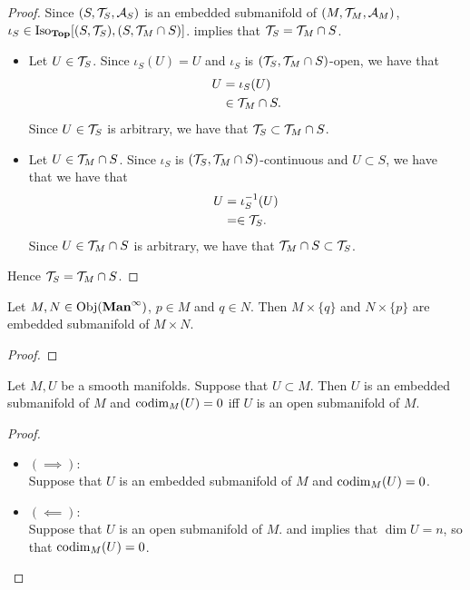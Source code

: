 \documentclass{book}
\begin{document}
	\begin{proof}
		Since $(S, \mathcal{T}_S, \mathcal{A}_S)$ is an embedded submanifold of $(M, \mathcal{T}_M, \mathcal{A}_M)$, $\iota_S \in \operatorname{Iso}_{\operatorname*{\text{\textbf{Top}}}}[(S, \mathcal{T}_S), (S, \mathcal{T}_M \cap S)]$.  implies that $\mathcal{T}_S = \mathcal{T}_M \cap S$.
		\begin{itemize}
			\item Let $U \in \mathcal{T}_S$. Since $\iota_S(U) = U$ and $\iota_S$ is $(\mathcal{T}_S, \mathcal{T}_M \cap S)$-open, we have that 
			\begin{align*}
				U 
				& = \iota_S(U) \\
				& \in \mathcal{T}_M \cap S.
			\end{align*}
			Since $U \in \mathcal{T}_S$ is arbitrary, we have that $\mathcal{T}_S \subset \mathcal{T}_M \cap S$.  
			\item Let $U \in \mathcal{T}_M \cap S$. Since $\iota_S$ is $(\mathcal{T}_S, \mathcal{T}_M \cap S)$-continuous and $U \subset S$, we have that we have that 
			\begin{align*}
				U
				& = \iota_S^{-1}(U) \\
				& = \in \mathcal{T}_S.
			\end{align*}
			Since $U \in \mathcal{T}_M \cap S$ is arbitrary, we have that  $\mathcal{T}_M \cap S \subset \mathcal{T}_S$. 
		\end{itemize}
		Hence $\mathcal{T}_S = \mathcal{T}_M \cap S$. 
	\end{proof}

	\begin{ex} 
		Let $M, N \in \operatorname{Obj}(\operatorname*{\text{\textbf{Man}}^{\infty}})$, $p \in M$ and $q \in N$. Then $M \times \{q\}$ and $N \times \{p\}$ are embedded submanifold of $M \times N$. 
	\end{ex}

	\begin{proof}
	\end{proof}

	\begin{ex} 
		Let $M, U$ be a smooth manifolds. Suppose that $U \subset M$. Then $U$ is an embedded submanifold of $M$ and $\operatorname{codim}_M(U) = 0$ iff $U$ is an open submanifold of $M$. 
	\end{ex}

	\begin{proof}\
		\begin{itemize}
			\item $(\implies):$ \\
			Suppose that $U$ is an embedded submanifold of $M$ and $\operatorname{codim}_M(U) = 0$. 
			\item $(\impliedby):$ \\
			Suppose that $U$ is an open submanifold of $M$.   and  implies that $\dim U = n$, so that $\operatorname{codim}_M(U) = 0$.
		\end{itemize}
	\end{proof}
\end{document}
